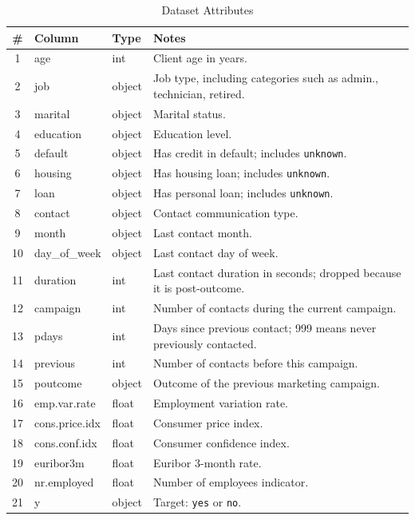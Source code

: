 \documentclass[10pt,twocolumn]{article}
\begin{document}
\begin{table}[t]
\caption{Dataset Attributes}
\label{tab:attributes}
\centering
\scriptsize
\begin{tabular}{c l l p{3.9in}}
\toprule
\# & Column & Type & Notes\\
\midrule
1 & age & int & Client age in years.\\
2 & job & object & Job type, including categories such as admin., technician, retired.\\
3 & marital & object & Marital status.\\
4 & education & object & Education level.\\
5 & default & object & Has credit in default; includes \texttt{unknown}.\\
6 & housing & object & Has housing loan; includes \texttt{unknown}.\\
7 & loan & object & Has personal loan; includes \texttt{unknown}.\\
8 & contact & object & Contact communication type.\\
9 & month & object & Last contact month.\\
10 & day\_of\_week & object & Last contact day of week.\\
11 & duration & int & Last contact duration in seconds; dropped because it is post-outcome.\\
12 & campaign & int & Number of contacts during the current campaign.\\
13 & pdays & int & Days since previous contact; 999 means never previously contacted.\\
14 & previous & int & Number of contacts before this campaign.\\
15 & poutcome & object & Outcome of the previous marketing campaign.\\
16 & emp.var.rate & float & Employment variation rate.\\
17 & cons.price.idx & float & Consumer price index.\\
18 & cons.conf.idx & float & Consumer confidence index.\\
19 & euribor3m & float & Euribor 3-month rate.\\
20 & nr.employed & float & Number of employees indicator.\\
21 & y & object & Target: \texttt{yes} or \texttt{no}.\\
\bottomrule
\end{tabular}
\end{table}
\end{document}
